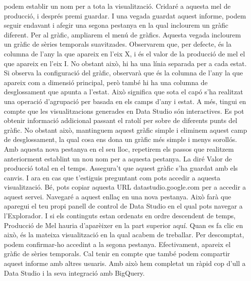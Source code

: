 \documentclass[12pt,longbibliography]{article}
\theoremstyle{definition}
\theoremstyle{remark}
\begin{document}
podem establir un nom per a tota la visualització. Cridaré a aquesta mel de producció, i després premi guardar. I una vegada guardat aquest informe, podem seguir endavant i afegir una segona pestanya en la qual inclourem un gràfic diferent. Per al gràfic, ampliarem el menú de gràfics. Aquesta vegada inclourem un gràfic de sèries temporals suavitzades. Observarem que, per defecte, és la columna de l'any la que apareix en l'eix X, i és el valor de la producció de mel el que apareix en l'eix I. No obstant això, hi ha una línia separada per a cada estat. Si observa la configuració del gràfic, observarà que és la columna de l'any la que apareix com a dimensió principal, però també hi ha una columna de desglossament que apunta a l'estat. Això significa que sota el capó s'ha realitzat una operació d'agrupació per basada en els camps d'any i estat. A més, tingui en compte que les visualitzacions generades en Data Studio són interactives. Es pot obtenir informació addicional passant el ratolí per sobre de diferents punts del gràfic. No obstant això, mantinguem aquest gràfic simple i eliminem aquest camp de desglossament, la qual cosa ens dona un gràfic més simple i menys sorollós. Amb aquesta nova pestanya en el seu lloc, repetirem els passos que realitzem anteriorment establint un nou nom per a aquesta pestanya. La diré Valor de producció total en el temps. Assegura't que aquest gràfic s'ha guardat amb els canvis. I ara en cas que t'estiguis preguntant com pots accedir a aquesta visualització. Bé, pots copiar aquesta URL datastudio.google.com per a accedir a aquest servei. Navegaré a aquest enllaç en una nova pestanya. Això farà que aparegui el teu propi panell de control de Data Studio en el qual pots navegar a l'Explorador. I si els continguts estan ordenats en ordre descendent de temps, Producció de Mel hauria d'aparèixer en la part superior aquí. Quan es fa clic en això, és la mateixa visualització en la qual acabem de treballar. Per descomptat, podem confirmar-ho accedint a la segona pestanya. Efectivament, apareix el gràfic de sèries temporals. Cal tenir en compte que també podem compartir aquest informe amb altres usuaris. Amb això hem completat un ràpid cop d'ull a Data Studio i la seva integració amb BigQuery.

\newpage

\listoffigures
\end{document}
